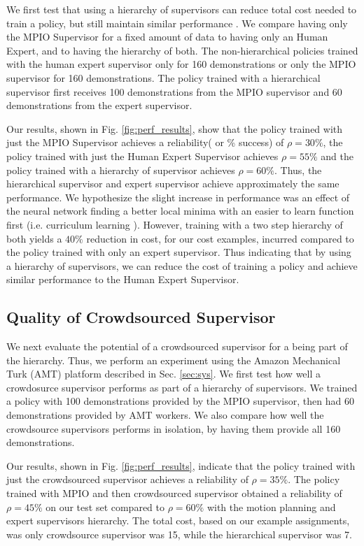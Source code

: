 \documentclass[10pt, conference]{ieeeconf}      %
\begin{document}
We first test that using a hierarchy of supervisors can reduce total cost needed to train a policy, but still maintain 
similar performance . We compare having only the MPIO Supervisor for a fixed amount of data to having only an Human Expert,
and to having the hierarchy of both. The non-hierarchical policies trained with the human expert supervisor only for
160 demonstrations or only the MPIO supervisor for 160 demonstrations.  The policy trained with a hierarchical supervisor
first receives  100 demonstrations from the MPIO supervisor and  60 demonstrations from the expert supervisor. 

Our results, shown in Fig. \ref{fig:perf_results}, show that the policy trained with just the MPIO Supervisor
achieves a reliability( or \% success) of $\rho = 30\%$, the policy trained with just the Human Expert Supervisor achieves $\rho=55\%$ and the policy
trained with a hierarchy of supervisor achieves $\rho=60\%$.  Thus, the hierarchical supervisor and expert supervisor achieve
approximately the same performance. We hypothesize the slight increase in performance was an effect of the neural network finding a better local minima with an easier to learn function first (i.e. curriculum learning \cite{bengio2009curriculum}). However, training with a two step hierarchy of both yields a $40\%$ reduction in
cost, for our cost examples, incurred compared to the policy trained with only an expert supervisor. Thus indicating that by using a hierarchy of supervisors, we can reduce the cost of training a policy and achieve similar performance to the Human Expert Supervisor.

\subsection{Quality of Crowdsourced Supervisor}
We next evaluate the potential of a  crowdsourced supervisor for a being part of the hierarchy. Thus, we perform an
experiment using the Amazon Mechanical Turk (AMT) platform described in Sec. \ref{sec:sys}. We  first test how well a crowdosurce supervisor
performs as part of a hierarchy of supervisors. We trained a policy with 100  demonstrations provided by the MPIO
supervisor, then had 60 demonstrations provided by AMT workers. We also compare how well the crowdsource supervisors
performs in isolation, by having them provide all 160 demonstrations.

Our results, shown in Fig. \ref{fig:perf_results}, indicate that the policy trained with just the crowdsourced supervisor achieves
a reliability of $\rho=35\%$. The policy trained with MPIO and then crowdsourced  supervisor obtained a reliability of
$\rho=45\%$ on our test set compared to $\rho=60\%$ with the motion planning and expert supervisors hierarchy. The total cost, based on our  example assignments, was
only crowdsource supervisor was 15, while the hierarchical supervisor was 7. 
\end{document}
